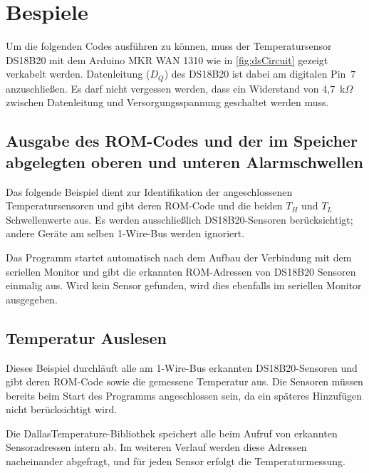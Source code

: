 
\section{Bespiele}
	Um die folgenden Codes ausführen zu können, muss der Temperatursensor DS18B20 mit dem Arduino MKR WAN 1310 wie in \autoref{fig:dsCircuit} gezeigt verkabelt werden. Datenleitung ($D_Q$) des DS18B20 ist dabei am digitalen Pin~7 anzuschlie{\ss}en. Es darf nicht vergessen werden, dass ein Widerstand von 4{,}7~k$\Omega$ zwischen Datenleitung und Versorgungsspannung geschaltet werden muss.
	
\subsection{Ausgabe des ROM-Codes und der im Speicher abgelegten oberen und unteren Alarmschwellen}
	Das folgende Beispiel dient zur Identifikation der angeschlossenen Temperatursensoren und gibt deren ROM-Code und die beiden $T_H$ und $T_L$ Schwellenwerte aus. Es werden ausschlie{\ss}lich DS18B20-Sensoren berücksichtigt; andere Geräte am selben 1-Wire-Bus werden ignoriert. 
	
	Das Programm startet automatisch nach dem Aufbau der Verbindung mit dem seriellen Monitor und gibt die erkannten ROM-Adressen von DS18B20 Sensoren einmalig aus. Wird kein Sensor gefunden, wird dies ebenfalls im seriellen Monitor ausgegeben.
	
	
	{
		
	}
	
\subsection{Temperatur Auslesen}

	Dieses Beispiel durchläuft alle am 1-Wire-Bus erkannten DS18B20-Sensoren und gibt deren ROM-Code sowie die gemessene Temperatur aus. Die Sensoren müssen bereits beim Start des Programms angeschlossen sein, da ein späteres Hinzufügen nicht berücksichtigt wird. 
	
	Die DallasTemperature-Bibliothek speichert alle beim Aufruf von  erkannten Sensoradressen intern ab. Im weiteren Verlauf werden diese Adressen nacheinander abgefragt, und für jeden Sensor erfolgt die Temperaturmessung. 
	
